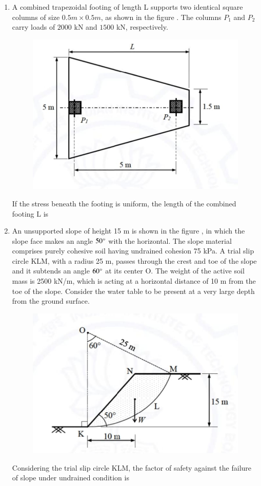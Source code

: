 \documentclass[journal,12pt,onecolumn]{article}
\theoremstyle{remark}
\begin{document}
\begin{enumerate}
\item A combined trapezoidal footing of length L supports two identical square columns  of size $0.5 m \times 0.5 m$, as shown in the figure  . The columns $P_1$ and $P_2$ carry loads of $2000$ kN and $1500$ kN, respectively.
\begin{figure}[H]
    \centering
    \includegraphics[width=0.7\columnwidth]{figs/1q46.jpg}
    \caption{}
    \label{fig:q46}
\end{figure}
If the stress beneath the footing is uniform, the length of the combined footing L  is \underline{\hspace{2cm}}

\hfill{}

\item An unsupported slope of height 15 m is shown in the figure , in which the slope face makes an angle $50\degree$ with the horizontal. The slope material comprises purely cohesive soil having undrained cohesion 75 kPa. A trial slip circle KLM, with a radius 25 m, passes through the crest and toe of the slope and it subtends an angle $60\degree$ at its center O. The weight of the active soil mass  is 2500 kN/m, which is acting at a horizontal distance of 10 m from the toe of the slope. Consider the water table to be present at a very large depth from the ground surface.
\begin{figure}[H]
    \centering
    \includegraphics[width=0.7\columnwidth]{figs/1q47.jpg}
    \caption{}
    \label{fig:q47}
\end{figure}
Considering the trial slip circle KLM, the factor of safety against the failure of slope under undrained condition  is \underline{\hspace{2cm}}


\end{enumerate}
\end{document}
